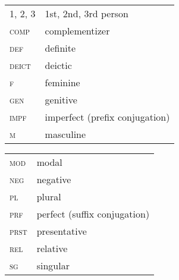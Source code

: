 \documentclass[output=paper]{langsci/langscibook}
\begin{document}
\begin{tabularx}{.5\textwidth}{@{}lQ@{}}
\textsc{1, 2, 3} & 1st, 2nd, 3rd person \\
\textsc{comp} & complementizer \\
\textsc{def} & definite \\
\textsc{deict} & deictic \\
\textsc{f} & feminine \\
\textsc{gen} & genitive \\
\textsc{impf} & imperfect (prefix conjugation) \\
\textsc{m} & masculine \\
\end{tabularx}%
\begin{tabularx}{.5\textwidth}{@{}lQ@{}}
\textsc{mod} & modal \\
\textsc{neg} & negative \\
\textsc{pl} & plural \\
\textsc{prf} & perfect (suffix conjugation) \\
\textsc{prst} & presentative \\
\textsc{rel} & relative \\
\textsc{sg} & singular \\
\end{tabularx}%


\sloppy
\printbibliography[heading=subbibliography,notkeyword=this] 
\end{document}
